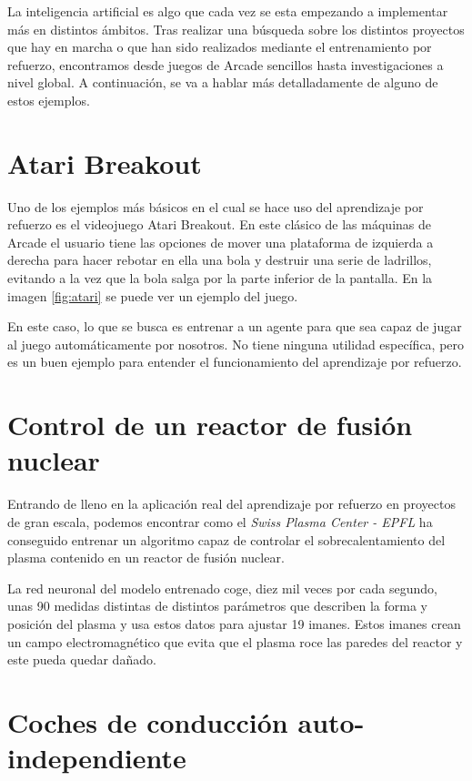 
La inteligencia artificial es algo que cada vez se esta empezando a implementar más en distintos ámbitos. Tras realizar una búsqueda sobre los distintos proyectos que hay en marcha o que han sido realizados mediante el entrenamiento por refuerzo, encontramos desde juegos de Arcade sencillos hasta investigaciones a nivel global.
A continuación, se va a hablar más detalladamente de alguno de estos ejemplos.


\section{Atari Breakout}

Uno de los ejemplos más básicos en el cual se hace uso del aprendizaje por refuerzo es el videojuego Atari Breakout. En este clásico de las máquinas de Arcade el usuario tiene las opciones de mover una plataforma de izquierda a derecha para hacer rebotar en ella una bola y destruir una serie de ladrillos, evitando a la vez que la bola salga por la parte inferior de la pantalla. En la imagen \ref{fig:atari} se puede ver un ejemplo del juego.

\label{fig:atari}

En este caso, lo que se busca es entrenar a un agente para que sea capaz de jugar al juego automáticamente por nosotros. No tiene ninguna utilidad específica, pero es un buen ejemplo para entender el funcionamiento del aprendizaje por refuerzo.


\section{Control de un reactor de fusión nuclear}

Entrando de lleno en la aplicación real del aprendizaje por refuerzo en proyectos de gran escala, podemos encontrar como el \textit{Swiss Plasma Center - EPFL}\cite{SPC} ha conseguido entrenar un algoritmo capaz de controlar el sobrecalentamiento del plasma contenido en un reactor de fusión nuclear.

La red neuronal del modelo entrenado coge, diez mil veces por cada segundo, unas 90 medidas distintas de distintos parámetros que describen la forma y posición del plasma y usa estos datos para ajustar 19 imanes. Estos imanes crean un campo electromagnético que evita que el plasma roce las paredes del reactor y este pueda quedar dañado.


\section{Coches de conducción auto-independiente}

